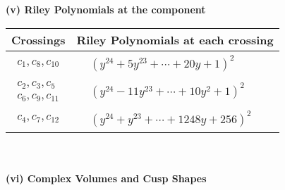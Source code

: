 \documentclass[1p]{elsarticle_modified}
\theoremstyle{definition}
\begin{document}
\newpage\renewcommand{\arraystretch}{1}
\flushleft \textbf{(v) Riley Polynomials at the component}\newline \\
\begin{tabular}{m{50pt}|m{274pt}}
Crossings & \hspace{64pt}Riley Polynomials at each crossing \\
\hline $$\begin{aligned}c_{1},c_{8},c_{10}\end{aligned}$$&$\begin{aligned}
&(y^{24}+5 y^{23}+\cdots+20 y+1)^{2}
\end{aligned}$\\
\hline $$\begin{aligned}c_{2},c_{3},c_{5}\\c_{6},c_{9},c_{11}\end{aligned}$$&$\begin{aligned}
&(y^{24}-11 y^{23}+\cdots+10 y^2+1)^{2}
\end{aligned}$\\
\hline $$\begin{aligned}c_{4},c_{7},c_{12}\end{aligned}$$&$\begin{aligned}
&(y^{24}+y^{23}+\cdots+1248 y+256)^{2}
\end{aligned}$\\
\hline
\end{tabular}\\~\\
\newpage\flushleft \textbf{(vi) Complex Volumes and Cusp Shapes}
\end{document}
